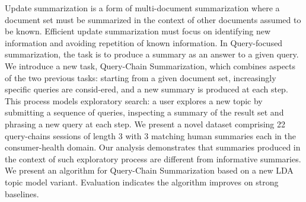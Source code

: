 Update summarization is a form of multi-document summarization where a document set must be summarized in the context of other documents assumed to be known. Efficient update summarization must focus on identifying new information and avoiding repetition of known information. In Query-focused summarization, the task is to produce a summary as an answer to a given query.  We introduce a new task, Query-Chain Summarization, which combines aspects of the two previous tasks: starting from a given document set, increasingly specific queries are consid-ered, and a new summary is produced at each step. This process models exploratory search: a user explores a new topic by submitting a sequence of queries, inspecting a summary of the result set and phrasing a new query at each step. We present a novel dataset comprising 22 query-chains sessions of length 3 with 3 matching human summaries each in the consumer-health domain. Our analysis demonstrates that summaries produced in the context of such exploratory process are different from informative summaries. We present an algorithm for Query-Chain Summarization based on a new LDA topic model variant. Evaluation indicates the algorithm improves on strong baselines.
